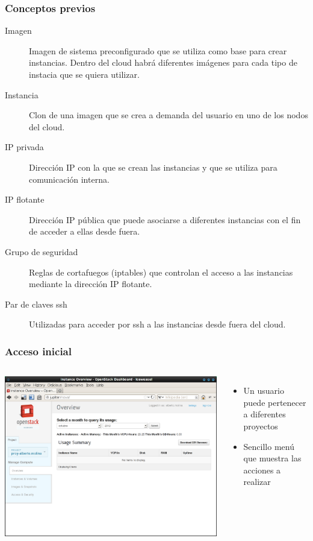 \documentclass{beamer}
\begin{document}
\begin{frame}
  \frametitle{Conceptos previos}
  \begin{description}
  \item[Imagen] Imagen de sistema preconfigurado que se utiliza como base para
    crear instancias. Dentro del cloud habrá diferentes imágenes para cada tipo
    de instacia que se quiera utilizar. 
  \item[Instancia] Clon de una imagen que se crea a demanda del usuario en uno
    de los nodos del cloud.
  \item[IP privada] Dirección IP con la que se crean las instancias y que se
    utiliza para comunicación interna. 
  \item[IP flotante] Dirección IP pública que puede asociarse a diferentes
    instancias con el fin de acceder a ellas desde fuera. 
  \item [Grupo de seguridad] Reglas de cortafuegos (iptables) que controlan el
    acceso a las instancias mediante la dirección IP flotante. 
  \item[Par de claves ssh] Utilizadas para acceder por ssh a las instancias
    desde fuera del cloud.
  \end{description}
\end{frame}

\begin{frame}
  \frametitle{Acceso inicial}
  \begin{columns}
    \includegraphics[width=\columnwidth]{../img/horizon2.png}
    \begin{itemize}
    \item Un usuario puede pertenecer a diferentes proyectos
    \item Sencillo menú que muestra las acciones a realizar
    \end{itemize}
  \end{columns}
\end{frame}
\end{document}
